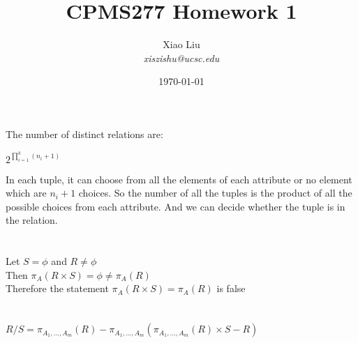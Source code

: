 \documentclass{article}
\begin{document}
\title{CPMS277 Homework 1}
\author{Xiao Liu\\
  \emph{xiszishu@ucsc.edu}}
\date{\today}
\maketitle

\section{}
The number of distinct relations are:\\
\begin{center}
$2^{\prod\limits_{i=1}^{k}(n_{i}+1)}$
\end{center}
In each tuple, it can choose from all the elements of each attribute or no element which are $n_{i}+1$ choices. So the number of all the tuples is the product of all the possible choices from each attribute. And we can decide whether the tuple is in the relation.\\

\section{}

Let $S=\phi$ and $R\neq\phi$\\
Then $\pi_{A}(R\times S)=\phi\neq\pi_{A}(R)$\\
Therefore  the statement $\pi_{A}(R\times S)=\pi_{A}(R)$ is false\\

\section{}
$R/S=\pi_{A_{1},...,A_{m}}(R)-\pi_{A_{1},...,A_{m}}(\pi_{A_{1},...,A_{m}}(R)\times S-R)$
\end{document}
